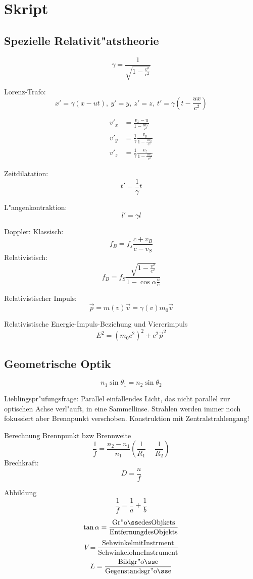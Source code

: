 \documentclass[12pt]{report}
\begin{document}
\chapter{Skript}

\section{Spezielle Relativit"atstheorie}

\[\gamma=\frac{1}{\sqrt{1-\frac{v^2}{c^2}}}\]

Lorenz-Trafo:
\[x'=\gamma(x-ut),\ y'=y,\ z'=z,\ t'=\gamma\left(t-\frac{ux}{c^2}\right)\]

\begin{align*}
v'_x&=\frac{v_x-u}{1-\frac{uv_x}{c^2}}\\
v'_y&=\frac{1}{\gamma}\frac{v_y}{1-\frac{uv_z}{c^2}}\\
v'_z&=\frac{1}{\gamma}\frac{v_z}{1-\frac{uv_x}{c^2}}
\end{align*}

Zeitdilatation:
\[t'=\frac{1}{\gamma}t\]

L"angenkontraktion:
\[l'=\gamma l\]

Doppler:
Klassisch: \[f_B=f_s\frac{c+v_B}{c-v_S}\]
Relativistisch: \[f_B=f_S\frac{\sqrt{1-\frac{v^2}{c^2}}}{1-\cos\alpha\frac{u}{c}}\]

Relativistischer Impuls:
\[\vec{p}=m(v)\vec{v}=\gamma(v)m_0\vec{v}\]

Relativistische Energie-Impuls-Beziehung und Viererimpuls
\[E^2=(m_0c^2)^2+c^2\vec{p}^2\]

\section{Geometrische Optik}

\[n_1\sin\theta_1=n_2\sin\theta_2\]

Lieblingspr"ufungsfrage: Parallel einfallendes Licht, das nicht parallel zur optischen Achse verl"auft, in eine Sammellinse. Strahlen werden immer noch fokussiert aber Brennpunkt verschoben. Konstruktion mit Zentralstrahlengang!

Berechnung Brennpunkt bzw Brennweite
\[\frac{1}{f}=\frac{n_2-n_1}{n_1}\left(\frac{1}{R_1}-\frac{1}{R_2}\right)\]
Brechkraft: \[D=\frac{n}{f}\]

Abbildung \[\frac{1}{f}=\frac{1}{a}+\frac{1}{b}\]

\[\tan\alpha=\mathrm{\frac{Gr"o\ss e des Objkets}{Entfernung des Objekts}}\]
\[V=\mathrm{\frac{Sehwinkel mit Instrment}{Sehwinkel ohne Instrument}}\]
\[L=\mathrm{\frac{Bildgr"o\ss e}{Gegenstandsgr"o\ss e}}\]
\end{document}
